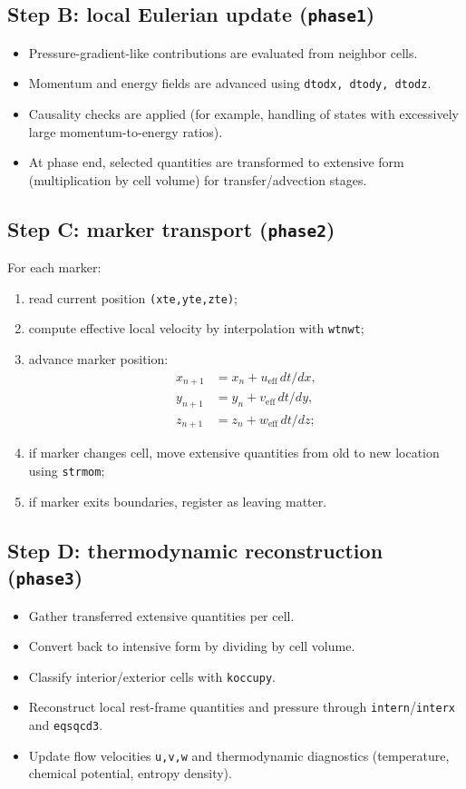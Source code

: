 \documentclass[11pt,a4paper]{article}
\begin{document}
\subsection{Step B: local Eulerian update (\texttt{phase1})}
\begin{itemize}
\item Pressure-gradient-like contributions are evaluated from neighbor cells.
\item Momentum and energy fields are advanced using \texttt{dtodx, dtody, dtodz}.
\item Causality checks are applied (for example, handling of states with
      excessively large momentum-to-energy ratios).
\item At phase end, selected quantities are transformed to extensive form
      (multiplication by cell volume) for transfer/advection stages.
\end{itemize}

\subsection{Step C: marker transport (\texttt{phase2})}
For each marker:
\begin{enumerate}
\item read current position \texttt{(xte,yte,zte)};
\item compute effective local velocity by interpolation with \texttt{wtnwt};
\item advance marker position:
\begin{align*}
x_{n+1} &= x_n + u_{\text{eff}}\,dt/dx,\\
y_{n+1} &= y_n + v_{\text{eff}}\,dt/dy,\\
z_{n+1} &= z_n + w_{\text{eff}}\,dt/dz;
\end{align*}
\item if marker changes cell, move extensive quantities from old to new
      location using \texttt{strmom};
\item if marker exits boundaries, register as leaving matter.
\end{enumerate}

\subsection{Step D: thermodynamic reconstruction (\texttt{phase3})}
\begin{itemize}
\item Gather transferred extensive quantities per cell.
\item Convert back to intensive form by dividing by cell volume.
\item Classify interior/exterior cells with \texttt{koccupy}.
\item Reconstruct local rest-frame quantities and pressure through
      \texttt{intern}/\texttt{interx} and \texttt{eqsqcd3}.
\item Update flow velocities \texttt{u,v,w} and thermodynamic diagnostics
      (temperature, chemical potential, entropy density).
\end{itemize}
\end{document}
